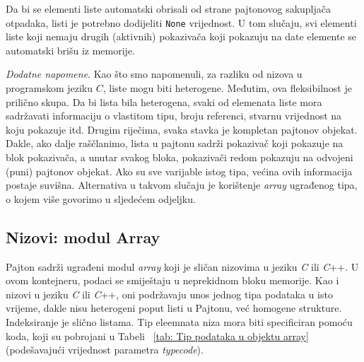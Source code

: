 Da bi se elementi liste automatski obrisali od strane pajtonovog sakupljača otpadaka, listi je potrebno dodijeliti \texttt{None} vrijednost.  U tom slučaju, svi elementi liste koji nemaju drugih (aktivnih) pokazivača koji pokazuju na date elemente se automatski brišu iz memorije. 

\textit{Dodatne napomene}. Kao što smo napomenuli, za razliku od nizova u programskom jeziku $C$, liste mogu biti heterogene. Međutim, ova fleksibilnost je prilično skupa. Da bi lista bila heterogena, svaki od elemenata liste mora sadržavati informaciju o vlastitom tipu, broju referenci, stvarnu vrijednost na koju pokazuje itd. Drugim riječima, svaka stavka je kompletan pajtonov objekat. Dakle, ako   dalje raščlanimo, lista u pajtonu sadrži pokazivač koji   pokazuje na   blok pokazivača, a unutar svakog bloka,  pokazivači redom pokazuju na odvojeni (puni) pajtonov objekat.  Ako su sve varijable istog tipa, većina ovih informacija postaje suvišna. Alternativa u takvom slučaju je korištenje \textit{array} ugrađenog tipa, o kojem više govorimo u sljedećem odjeljku.   %

\subsection{Nizovi: modul Array}

Pajton sadrži ugrađeni modul \textit{array} koji je sličan nizovima u jeziku  \textit{C} ili \textit{C}++. U ovom kontejneru, podaci se smiještaju u neprekidnom bloku memorije. Kao i nizovi u jeziku \textit{C} ili \textit{C}++, oni podržavaju unos jednog tipa podataka u isto vrijeme, dakle nisu heterogeni poput listi u Pajtonu, već homogene strukture. Indeksiranje je slično listama. Tip eleemnata niza mora biti specificiran pomoću koda, koji su pobrojani u Tabeli~ \ref{tab: Tip podataka u objektu array} (podešavajući vrijednost parametra \textit{typecode}). 

